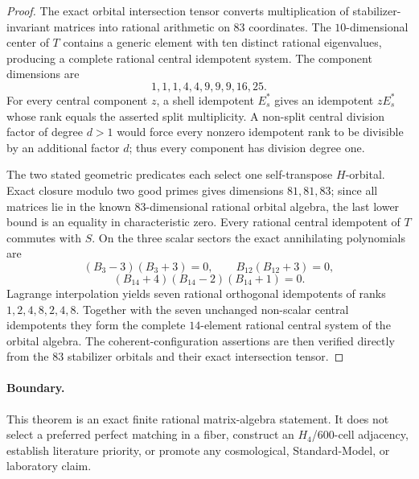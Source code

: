 \begin{proof}
The exact orbital intersection tensor converts multiplication of
stabilizer-invariant matrices into rational arithmetic on $83$ coordinates.
The $10$-dimensional center of $T$ contains a generic element with ten
distinct rational eigenvalues, producing a complete rational central
idempotent system.  The component dimensions are
\[
1,1,1,4,4,9,9,9,16,25.
\]
For every central component $z$, a shell idempotent $E_s^*$ gives an
idempotent $zE_s^*$ whose rank equals the asserted split multiplicity.  A
non-split central division factor of degree $d>1$ would force every nonzero
idempotent rank to be divisible by an additional factor $d$; thus every
component has division degree one.

The two stated geometric predicates each select one self-transpose
$H$-orbital.  Exact closure modulo two good primes gives dimensions
$81,81,83$; since all matrices lie in the known $83$-dimensional rational
orbital algebra, the last lower bound is an equality in characteristic
zero.  Every rational central idempotent of $T$ commutes with $S$.  On the
three scalar sectors the exact annihilating polynomials are
\[
(B_3-3)(B_3+3)=0,
\qquad
B_{12}(B_{12}+3)=0,
\]
\[
(B_{14}+4)(B_{14}-2)(B_{14}+1)=0.
\]
Lagrange interpolation yields seven rational orthogonal idempotents of
ranks $1,2,4,8,2,4,8$.  Together with the seven unchanged non-scalar
central idempotents they form the complete $14$-element rational central
system of the orbital algebra.  The coherent-configuration assertions are
then verified directly from the $83$ stabilizer orbitals and their exact
intersection tensor.
\end{proof}

\paragraph{Boundary.}
This theorem is an exact finite rational matrix-algebra statement.  It does
not select a preferred perfect matching in a fiber, construct an
$H_4$/600-cell adjacency, establish literature priority, or promote any
cosmological, Standard-Model, or laboratory claim.
